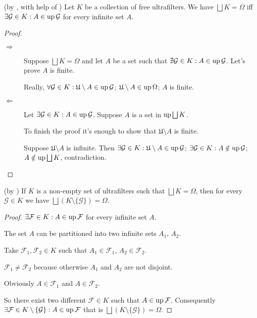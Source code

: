 \begin{lem}
(by , with help of ) Let
$K$ be a collection of free ultrafilters. We have $\bigsqcup K=\Omega$
iff $\exists\mathcal{G}\in K:A\in\operatorname{up}\mathcal{G}$ for every infinite
set $A$.\end{lem}
\begin{proof}
~
\begin{description}
\item [{$\Rightarrow$}] Suppose $\bigsqcup K=\Omega$ and let $A$ be
a set such that $\nexists\mathcal{G}\in K:A\in\operatorname{up}\mathcal{G}$. Let's
prove $A$ is finite.


Really, $\forall\mathcal{G}\in K:\mathfrak{U}\setminus A\in\operatorname{up}\mathcal{G}$;
$\mathfrak{U}\setminus A\in\operatorname{up}\Omega$; $A$ is finite.

\item [{$\Leftarrow$}] Let $\exists\mathcal{G}\in K:A\in\operatorname{up}\mathcal{G}$.
Suppose $A$ is a set in $\operatorname{up}\bigsqcup K$.


To finish the proof it's enough to show that $\mathfrak{U}\setminus A$
is finite.


Suppose $\mathfrak{U}\setminus A$ is infinite. Then $\exists\mathcal{G}\in K:\mathfrak{U}\setminus A\in\operatorname{up}\mathcal{G}$;
$\exists\mathcal{G}\in K:A\notin\operatorname{up}\mathcal{G}$; $A\notin\operatorname{up}\bigsqcup K$,
contradiction.

\end{description}
\end{proof}
\begin{lem}
(by ) If $K$ is a non-empty set of ultrafilters
such that $\bigsqcup K=\Omega$, then for every $\mathcal{G}\in K$
we have $\bigsqcup(K\setminus\{\mathcal{G}\})=\Omega$.\end{lem}
\begin{proof}
$\exists\mathcal{F}\in K:A\in\operatorname{up}\mathcal{F}$ for every infinite set
$A$.

The set $A$ can be partitioned into two infinite sets $A_{1}$, $A_{2}$.

Take $\mathcal{F}_{1},\mathcal{F}_{2}\in K$ such that $A_{1}\in\mathcal{F}_{1}$,
$A_{2}\in\mathcal{F}_{2}$.

$\mathcal{F}_{1}\ne\mathcal{F}_{2}$ because otherwise $A_{1}$ and
$A_{2}$ are not disjoint.

Obviously $A\in\mathcal{F}_{1}$ and $A\in\mathcal{F}_{2}$.

So there exist two different $\mathcal{F}\in K$ such that $A\in\operatorname{up}\mathcal{F}$.
Consequently $\exists\mathcal{F}\in K\setminus\{\mathcal{G}\}:A\in\operatorname{up}\mathcal{F}$
that is $\bigsqcup(K\setminus\{\mathcal{G}\})=\Omega$.\end{proof}
